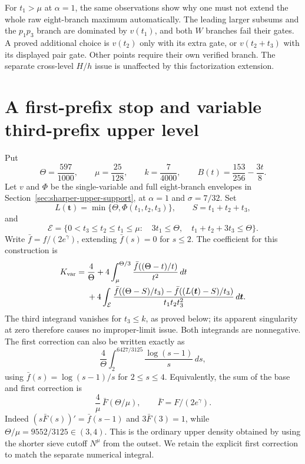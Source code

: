 \documentclass[11pt]{article}
\begin{document}
For $t_1>\mu$ at $\alpha=1$, the same observations show why one must
not extend the whole raw eight-branch maximum automatically.
The leading larger subsums and the $p_1p_3$ branch are dominated by
$v(t_1)$, and both $W$ branches fail their gates.  A proved additional
choice is $v(t_2)$ only with its extra gate, or $v(t_2+t_3)$ with its
displayed pair gate.  Other points require their own verified branch.
The separate cross-level $H/h$ issue is unaffected by this factorization
extension.

\section{A first-prefix stop and variable third-prefix upper level}
\label{sec:variable-prefix-upper}

Put
\[
 \Theta=\frac{597}{1000},\qquad \mu=\frac{25}{128},\qquad
 k=\frac7{4000},\qquad B(t)=\frac{153}{256}-\frac{3t}{8}.
\]
Let $v$ and $\Phi$ be the single-variable and full eight-branch
envelopes in Section~\ref{sec:sharper-upper-support}, at
$\alpha=1$ and $\sigma=7/32$. Set
\[
 L(\boldsymbol t)=\min\{\Theta,\Phi(t_1,t_2,t_3)\},\qquad
 S=t_1+t_2+t_3,
\]
and
\[
 \mathcal E=\{0<t_3\le t_2\le t_1\le\mu:\quad
          3t_1\le\Theta,\quad t_1+t_2+3t_3\le\Theta\}.
\]
Write $\bar f=f/(2e^\gamma)$, extending $\bar f(s)=0$ for $s\le2$.
The coefficient for this construction is
\begin{align}
 K_{\rm var}={}&\frac4\Theta+
 4\int_\mu^{\Theta/3}
       \frac{\bar f((\Theta-t)/t)}{t^2}\,dt\notag\\
 &+4\int_{\mathcal E}
 \frac{\bar f((\Theta-S)/t_3)
       -\bar f((L(\boldsymbol t)-S)/t_3)}
 {t_1t_2t_3^2}\,d\boldsymbol t.
 \label{eq:variable-prefix-upper-coefficient}
\end{align}
The third integrand vanishes for $t_3\le k$, as proved below;
its apparent singularity at zero therefore causes no improper-limit
issue. Both integrands are nonnegative. The first correction can
also be written exactly as
\[
 \frac4\Theta\int_2^{6427/3125}\frac{\log(s-1)}s\,ds,
\]
using $\bar f(s)=\log(s-1)/s$ for $2\le s\le4$.
Equivalently, the sum of the base and first correction is
\[
 \frac4\mu\,\bar F(\Theta/\mu),\qquad
 \bar F=F/(2e^\gamma).
\]
Indeed $(s\bar F(s))'=\bar f(s-1)$ and
$3\bar F(3)=1$, while $\Theta/\mu=9552/3125\in(3,4)$.
This is the ordinary upper density obtained by using the shorter
sieve cutoff $N^\mu$ from the outset. We retain the explicit first
correction to match the separate numerical integral.
\end{document}
